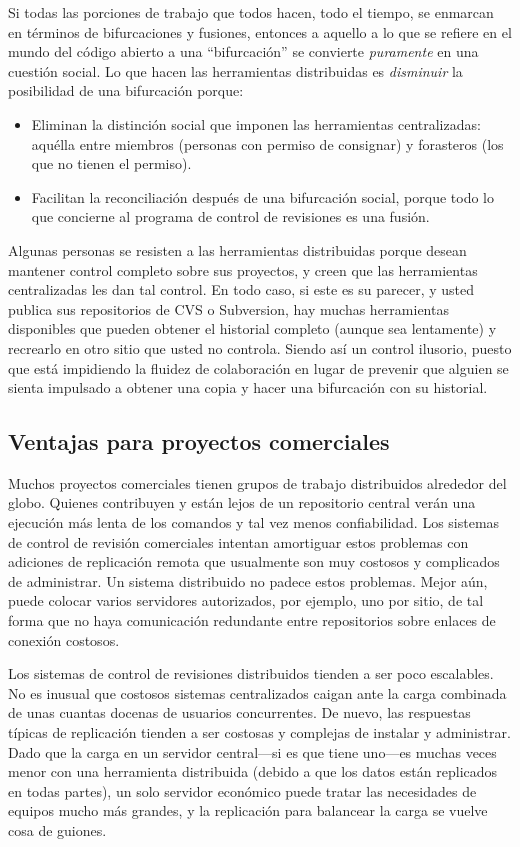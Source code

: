 Si todas las porciones de trabajo que todos hacen, todo el tiempo, se
enmarcan en términos de bifurcaciones y fusiones, entonces a aquello a
lo que se refiere en el mundo del código abierto a una ``bifurcación''
se convierte \emph{puramente} en una cuestión social. Lo que hacen las
herramientas distribuidas es \emph{disminuir} la posibilidad de una
bifurcación porque:
\begin{itemize}
\item Eliminan la distinción social que imponen las herramientas
  centralizadas: aquélla entre miembros (personas con permiso de
  consignar) y forasteros (los que no tienen el permiso).
\item Facilitan la reconciliación después de una bifurcación social,
  porque todo lo que concierne al programa de control de revisiones es
  una fusión.
\end{itemize}

Algunas personas se resisten a las herramientas distribuidas porque
desean mantener control completo sobre sus proyectos, y creen que las
herramientas centralizadas les dan tal control. En todo caso, si este
es su parecer, y usted publica sus repositorios de CVS o Subversion, hay
muchas herramientas disponibles que pueden obtener el historial
completo (aunque sea lentamente) y recrearlo en otro sitio que usted no
controla. Siendo así un control ilusorio, puesto que está impidiendo
la fluidez de colaboración en lugar de prevenir que alguien se sienta
impulsado a obtener una copia y hacer una bifurcación con su historial.

\subsection{Ventajas para proyectos comerciales}

Muchos proyectos comerciales tienen grupos de trabajo distribuidos
alrededor del globo.  Quienes contribuyen y están lejos de un
repositorio central verán una ejecución más lenta de los comandos y tal
vez menos confiabilidad. Los sistemas de control de revisión
comerciales intentan amortiguar estos problemas con adiciones de
replicación remota que usualmente son muy costosos y complicados de
administrar. Un sistema distribuido no padece estos problemas. Mejor
aún, puede colocar varios servidores autorizados, por ejemplo, uno por
sitio, de tal forma que no haya comunicación redundante entre
repositorios sobre enlaces de conexión costosos.

Los sistemas de control de revisiones distribuidos tienden a ser poco
escalables. No es inusual que costosos sistemas centralizados caigan
ante la carga combinada de unas cuantas docenas de usuarios
concurrentes. De nuevo, las respuestas típicas de replicación tienden
a ser costosas y complejas de instalar y administrar. Dado que la
carga en un servidor central---si es que tiene uno---es muchas veces
menor con una herramienta distribuida (debido a que los datos están
replicados en todas partes), un solo servidor económico puede tratar
las necesidades de equipos mucho más grandes, y la replicación para
balancear la carga se vuelve cosa de guiones.


